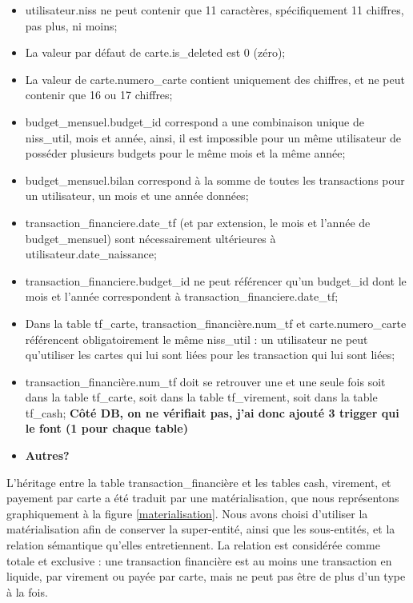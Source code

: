 \documentclass[a4paper,12pt]{article}
\begin{document}
\begin{itemize}
\item utilisateur.niss ne peut contenir que 11 caractères, spécifiquement 11 chiffres, pas plus, ni moins;
\item La valeur par défaut de carte.is\_deleted est 0 (zéro);
\item La valeur de carte.numero\_carte contient uniquement des chiffres, et ne peut contenir que 16 ou 17 chiffres;
\item budget\_mensuel.budget\_id correspond a une combinaison unique de niss\_util, mois et année, ainsi, il est impossible pour un même utilisateur de posséder plusieurs budgets pour le même mois et la même année;
\item budget\_mensuel.bilan correspond à la somme de toutes les transactions pour un utilisateur, un mois et une année données;
\item transaction\_financiere.date\_tf (et par extension, le mois et l'année de budget\_mensuel) sont nécessairement ultérieures à utilisateur.date\_naissance;
\item transaction\_financiere.budget\_id ne peut référencer qu'un budget\_id dont le mois et l'année correspondent à transaction\_financiere.date\_tf;
\item Dans la table tf\_carte, transaction\_financière.num\_tf et carte.numero\_carte référencent obligatoirement le même niss\_util : un utilisateur ne peut qu'utiliser les cartes qui lui sont liées pour les transaction qui lui sont liées;
\item transaction\_financière.num\_tf doit se retrouver une et une seule fois soit dans la table tf\_carte, soit dans la table tf\_virement, soit dans la table tf\_cash; \textbf{Côté DB, on ne vérifiait pas, j'ai donc ajouté 3 trigger qui le font (1 pour chaque table)}
\item \textbf{Autres?}
\end{itemize}

L'héritage entre la table transaction\_financière et les tables cash, virement, et payement par carte a été traduit par une matérialisation, que nous représentons graphiquement à la figure \ref{materialisation}.
Nous avons choisi d'utiliser la matérialisation afin de conserver la super-entité, ainsi que les sous-entités, et la relation sémantique qu'elles entretiennent.
La relation est considérée comme totale et exclusive : une transaction financière est au moins une transaction en liquide, par virement ou payée par carte, mais ne peut pas être de plus d'un type à la fois.
\end{document}
